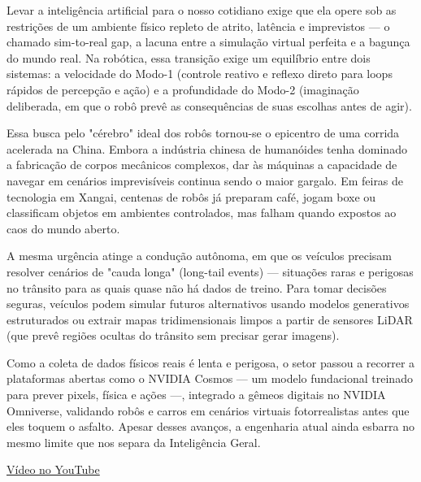 {

\subtitle{IA Física no Mundo Real}

\hspace*{1.5em}Levar a inteligência artificial para o nosso cotidiano exige que ela opere sob as restrições de um ambiente físico repleto de atrito, latência e imprevistos — o chamado sim-to-real gap, a lacuna entre a simulação virtual perfeita e a bagunça do mundo real. Na robótica, essa transição exige um equilíbrio entre dois sistemas: a velocidade do Modo-1 (controle reativo e reflexo direto para loops rápidos de percepção e ação) e a profundidade do Modo-2 (imaginação deliberada, em que o robô prevê as consequências de suas escolhas antes de agir).

\hspace*{1.5em}Essa busca pelo "cérebro" ideal dos robôs tornou-se o epicentro de uma corrida acelerada na China. Embora a indústria chinesa de humanóides tenha dominado a fabricação de corpos mecânicos complexos, dar às máquinas a capacidade de navegar em cenários imprevisíveis continua sendo o maior gargalo. Em feiras de tecnologia em Xangai, centenas de robôs já preparam café, jogam boxe ou classificam objetos em ambientes controlados, mas falham quando expostos ao caos do mundo aberto.

\hspace*{1.5em}A mesma urgência atinge a condução autônoma, em que os veículos precisam resolver cenários de "cauda longa" (long-tail events) — situações raras e perigosas no trânsito para as quais quase não há dados de treino. Para tomar decisões seguras, veículos podem simular futuros alternativos usando modelos generativos estruturados ou extrair mapas tridimensionais limpos a partir de sensores LiDAR (que prevê regiões ocultas do trânsito sem precisar gerar imagens).


\hspace*{1.5em}Como a coleta de dados físicos reais é lenta e perigosa, o setor passou a recorrer a plataformas abertas como o NVIDIA Cosmos — um modelo fundacional treinado para prever pixels, física e ações —, integrado a gêmeos digitais no NVIDIA Omniverse, validando robôs e carros em cenários virtuais fotorrealistas antes que eles toquem o asfalto. Apesar desses avanços, a engenharia atual ainda esbarra no mesmo limite que nos separa da Inteligência Geral.


\begin{hypeitemize}
\item \href{https://www.youtube.com/watch?v=9Uch931CdX8}{Vídeo no YouTube}
\end{hypeitemize}


}